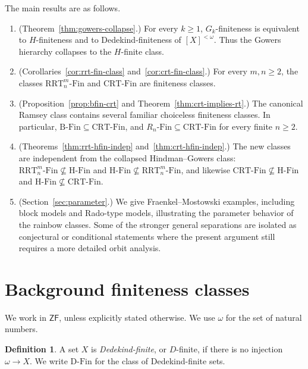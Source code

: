 \documentclass[10pt,a4paper]{amsart}
\theoremstyle{definition}
\newtheorem{definition}[theorem]{Definition}
\newcommand{\ZF}{\mathsf{ZF}}
\newcommand{\DFin}{\mathrm{D\text{-}Fin}}
\newcommand{\BFin}{\mathrm{B\text{-}Fin}}
\newcommand{\HFin}{\mathrm{H\text{-}Fin}}
\newcommand{\RnFin}[1]{R_{#1}\text{-}\mathrm{Fin}}
\newcommand{\RRT}{\mathrm{RRT}}
\newcommand{\CRT}{\mathrm{CRT}}
\newcommand{\RRTFin}[2]{\RRT^{#1}_{#2}\text{-}\mathrm{Fin}}
\newcommand{\CRTFin}{\CRT\text{-}\mathrm{Fin}}
\begin{document}
The main results are as follows.

\begin{enumerate}[label=(\arabic*)]
    \item (Theorem~\ref{thm:gowers-collapse}.)  For every \(k\geq 1\), \(G_k\)-finiteness is equivalent to \(H\)-finiteness and to Dedekind-finiteness of \([X]^{<\omega}\).  Thus the Gowers hierarchy collapses to the \(H\)-finite class.

    \item (Corollaries~\ref{cor:rrt-fin-class} and~\ref{cor:crt-fin-class}.)  For every \(m,n\geq 2\), the classes \(\RRTFin{m}{n}\) and \(\CRTFin\) are finiteness classes.

    \item (Proposition~\ref{prop:bfin-crt} and Theorem~\ref{thm:crt-implies-rt}.)  The canonical Ramsey class contains several familiar choiceless finiteness classes.  In particular, \(\BFin\subseteq \CRTFin\), and \(\RnFin{n}\subseteq \CRTFin\) for every finite \(n\geq 2\).

    \item (Theorems~\ref{thm:rrt-hfin-indep} and~\ref{thm:crt-hfin-indep}.)  The new classes are independent from the collapsed Hindman--Gowers class: \(\RRTFin{m}{n}\not\subseteq \HFin\) and \(\HFin\not\subseteq \RRTFin{m}{n}\), and likewise \(\CRTFin\not\subseteq \HFin\) and \(\HFin\not\subseteq \CRTFin\).

    \item (Section~\ref{sec:parameter}.)  We give Fraenkel--Mostowski examples, including block models and Rado-type models, illustrating the parameter behavior of the rainbow classes.  Some of the stronger general separations are isolated as conjectural or conditional statements where the present argument still requires a more detailed orbit analysis.
\end{enumerate}

\section{Background finiteness classes}

We work in \(\ZF\), unless explicitly stated otherwise.  We use \(\omega\) for the set of natural numbers.

\begin{definition}
A set \(X\) is \emph{Dedekind-finite}, or \(D\)-finite, if there is no injection \(\omega\to X\).  We write \(\DFin\) for the class of Dedekind-finite sets.
\end{definition}
\end{document}
